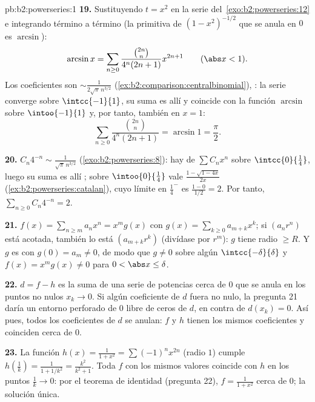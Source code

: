 \begin{solution}{pb:b2:powerseries:1}
\textbf{19.} Sustituyendo $t = x^2$ en la serie del~\cref{exo:b2:powerseries:12} e integrando término a término (la
primitiva de $(1-x^2)^{-1/2}$ que se anula en $0$ es $\arcsin$):
\[
\arcsin x = \sum_{n\geq0}
\frac{\binom{2n}n}{4^n(2n+1)}x^{2n+1}
\qquad(\abs x < 1) .
\]
Los coeficientes son $\sim \frac{1}{2\sqrt\pi\,n^{3/2}}$
(\cref{ex:b2:comparison:centralbinomial}), : la serie
converge \emph{} sobre $\intcc{-1}{1}$, su suma es allí
 y coincide con la función  $\arcsin$ sobre
$\intoo{-1}{1}$ y, por tanto, también en $x = 1$:
\[
\sum_{n\geq0}\frac{\binom{2n}n}{4^n(2n+1)}
= \arcsin 1 = \frac\pi2 .
\]

\textbf{20.} $C_n4^{-n} \sim \frac{1}{\sqrt\pi\,n^{3/2}}$
(\cref{exo:b2:powerseries:8}): hay  de $\sum
C_nx^n$ sobre $\intcc{0}{\frac14}$, luego su suma es allí
; sobre $\intoo{0}{\frac14}$ vale
$\frac{1-\sqrt{1-4x}}{2x}$ (\cref{ex:b2:powerseries:catalan}), cuyo
límite en $\frac14^-$ es $\frac{1-0}{1/2} = 2$. Por tanto,
$\sum_{n\geq0} C_n4^{-n} = 2$.

\textbf{21.} $f(x) = \sum_{n\geq m}a_nx^n = x^m g(x)$ con $g(x) =
\sum_{k\geq0}a_{m+k}x^k$; si $(a_nr^n)$ está acotada, también lo
está $(a_{m+k}r^k)$ (divídase por $r^m$): $g$ tiene radio $\geq R$.
Y $g$ es  con $g(0) = a_m \neq 0$, de modo que $g \neq 0$
sobre algún $\intcc{-\delta}{\delta}$ y $f(x) = x^mg(x) \neq 0$ para
$0 < \abs x \leq \delta$.

\textbf{22.} $d = f - h$ es la suma de una serie de potencias cerca
de $0$ que se anula en los puntos no nulos $x_k \to 0$. Si algún
coeficiente de $d$ fuera no nulo, la pregunta 21 daría un entorno
perforado de $0$ libre de ceros de $d$, en contra de $d(x_k) = 0$.
Así pues, todos los coeficientes de $d$ se anulan: $f$ y $h$ tienen
los mismos coeficientes y coinciden cerca de $0$.

\textbf{23.} La función $h(x) = \frac{1}{1+x^2} = \sum(-1)^nx^{2n}$
(radio $1$) cumple $h(\frac1k) = \frac{1}{1 + 1/k^2} =
\frac{k^2}{k^2+1}$. Toda $f$  con los mismos valores
coincide con $h$ en los puntos $\frac1k \to 0$: por el teorema de
identidad (pregunta 22), $f = \frac{1}{1+x^2}$ cerca de $0$; la
solución única.


\end{solution}
